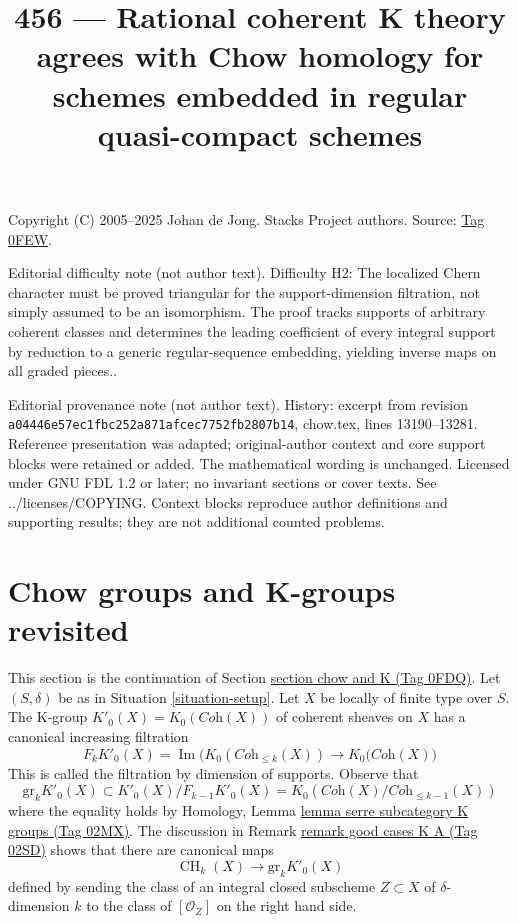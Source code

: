 \documentclass{amsart}
\theoremstyle{plain}
\theoremstyle{definition}
\theoremstyle{remark}
\numberwithin{equation}{subsection}
\def\CH{\mathop{\mathrm{CH}}\nolimits}
\def\Im{\mathop{\mathrm{Im}}}
\begin{document}
\title[Stacks Project, Tag 0FEW]{456 --- Rational coherent K theory agrees with Chow homology for schemes embedded in regular quasi-compact schemes}
\maketitle
\noindent Copyright (C) 2005--2025 Johan de Jong. Stacks Project authors. Source: \href{https://stacks.math.columbia.edu/tag/0FEW}{Tag 0FEW}.

\noindent Editorial difficulty note (not author text). Difficulty H2: The localized Chern character must be proved triangular for the support-dimension filtration, not simply assumed to be an isomorphism. The proof tracks supports of arbitrary coherent classes and determines the leading coefficient of every integral support by reduction to a generic regular-sequence embedding, yielding inverse maps on all graded pieces..

\noindent Editorial provenance note (not author text). History: excerpt from revision \texttt{a0444\allowbreak 6e57e\allowbreak c1fbc\allowbreak 252a8\allowbreak 71afc\allowbreak ec775\allowbreak 2fb28\allowbreak 07b14}, chow.tex, lines 13190--13281. Reference presentation was adapted; original-author context and core support blocks were retained or added. The mathematical wording is unchanged. Licensed under GNU FDL 1.2 or later; no invariant sections or cover texts. See ../licenses/COPYING. Context blocks reproduce author definitions and supporting results; they are not additional counted problems.

\section{Chow groups and K-groups revisited}
\label{section-chow-and-K-II}

\noindent
This section is the continuation of Section \href{https://stacks.math.columbia.edu/tag/0FDQ}{section chow and K (Tag 0FDQ)}.
Let $(S, \delta)$ be as in Situation \ref{situation-setup}.
Let $X$ be locally of finite type over $S$. The K-group
$K'_0(X) = K_0(\textit{Coh}(X))$ of coherent sheaves on $X$
has a canonical increasing filtration
$$
F_kK'_0(X) =
\Im\Big(K_0(\textit{Coh}_{\leq k}(X)) \to K_0(\textit{Coh}(X)\Big)
$$
This is called the filtration by dimension of supports. Observe that
$$
\text{gr}_k K'_0(X) \subset K'_0(X)/F_{k - 1}K'_0(X) =
K_0(\textit{Coh}(X)/\textit{Coh}_{\leq k - 1}(X))
$$
where the equality holds
by Homology, Lemma \href{https://stacks.math.columbia.edu/tag/02MX}{lemma serre subcategory K groups (Tag 02MX)}.
The discussion in Remark \href{https://stacks.math.columbia.edu/tag/02SD}{remark good cases K A (Tag 02SD)} shows
that there are canonical maps
$$
\CH_k(X) \longrightarrow \text{gr}_k K'_0(X)
$$
defined by sending the class of an integral closed subscheme
$Z \subset X$ of $\delta$-dimension $k$ to the class of
$[\mathcal{O}_Z]$ on the right hand side.
\end{document}
